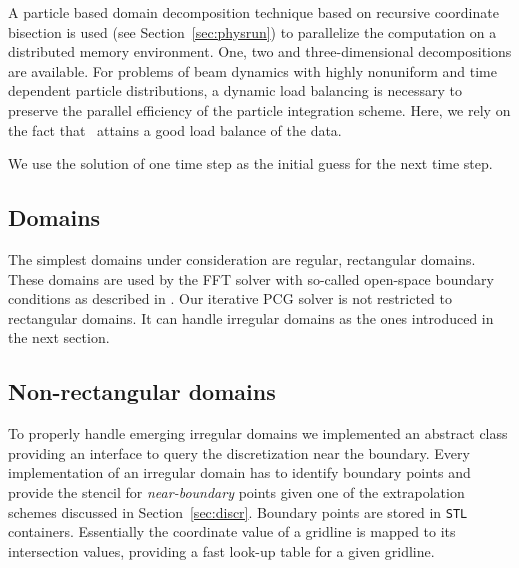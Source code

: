 A particle based domain decomposition technique based on recursive coordinate
bisection is used (see Section~\ref{sec:physrun}) to parallelize the computation
on a distributed memory environment.  One, two and three-dimensional
decompositions are available.  For problems of beam dynamics with highly
nonuniform and time dependent particle distributions, a dynamic load balancing
is necessary to preserve the parallel efficiency of the particle integration
scheme.  Here, we rely on the fact that \ippl\ attains a good load balance of
the data.



We use the solution of one time step as the initial guess for the next
time step.


\subsection{Domains}

The simplest domains under consideration are regular, rectangular
domains.  These domains are used by the FFT solver with so-called
open-space boundary conditions as described in \cite{hoea:88}.
Our iterative PCG solver is not restricted to rectangular domains.  It
can handle irregular domains as the ones introduced in the next section.

\subsection*{Non-rectangular domains}

To properly handle emerging irregular domains we implemented an abstract
class providing an interface to query the discretization near the
boundary.  Every implementation of an irregular domain has to identify
boundary points and provide the stencil for \textit{near-boundary}
points given one of the extrapolation schemes discussed in
Section~\ref{sec:discr}.  Boundary points are stored in \texttt{STL}
containers. Essentially the coordinate value of a gridline is mapped to
its intersection values, providing a fast look-up table for a given
gridline.

